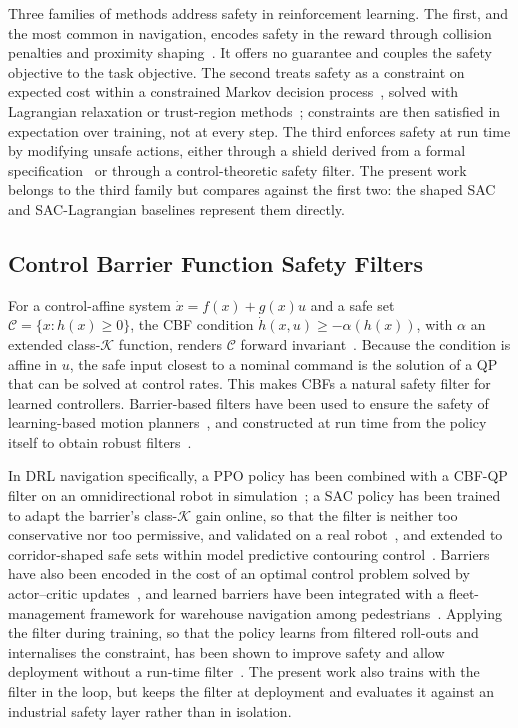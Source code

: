 \documentclass[sensors,article,submit,moreauthors]{Definitions/mdpi}
\begin{document}
Three families of methods address safety in reinforcement learning. The first, and the most common in navigation, encodes safety in the reward through collision penalties and proximity shaping~\citep{taheri2024ppo,cai2025agv,li2024warehouse}. It offers no guarantee and couples the safety objective to the task objective. The second treats safety as a constraint on expected cost within a constrained Markov decision process~\citep{altman1999cmdp}, solved with Lagrangian relaxation or trust-region methods~\citep{achiam2017cpo}; constraints are then satisfied in expectation over training, not at every step. The third enforces safety at run time by modifying unsafe actions, either through a shield derived from a formal specification~\citep{alshiekh2018shielding} or through a control-theoretic safety filter. The present work belongs to the third family but compares against the first two: the shaped SAC and SAC-Lagrangian baselines represent them directly.

\subsection{Control Barrier Function Safety Filters}

For a control-affine system $\dot{x} = f(x) + g(x)u$ and a safe set $\mathcal{C} = \{x : h(x) \geq 0\}$, the CBF condition $\dot{h}(x,u) \geq -\alpha(h(x))$, with $\alpha$ an extended class-$\mathcal{K}$ function, renders $\mathcal{C}$ forward invariant~\citep{ames2017cbfqp,ames2019cbf}. Because the condition is affine in $u$, the safe input closest to a nominal command is the solution of a QP that can be solved at control rates. This makes CBFs a natural safety filter for learned controllers. Barrier-based filters have been used to ensure the safety of learning-based motion planners~\citep{wang2022ensuring}, and constructed at run time from the policy itself to obtain robust filters~\citep{knoedler2025onthefly}.

In DRL navigation specifically, a PPO policy has been combined with a CBF-QP filter on an omnidirectional robot in simulation~\citep{guo2025radar}; a SAC policy has been trained to adapt the barrier's class-$\mathcal{K}$ gain online, so that the filter is neither too conservative nor too permissive, and validated on a real robot~\citep{mohammad2025sacadapt}, and extended to corridor-shaped safe sets within model predictive contouring control~\citep{mohammad2025corridor}. Barriers have also been encoded in the cost of an optimal control problem solved by actor--critic updates~\citep{wang2024safeadp}, and learned barriers have been integrated with a fleet-management framework for warehouse navigation among pedestrians~\citep{farrell2025warehouse}. Applying the filter during training, so that the policy learns from filtered roll-outs and internalises the constraint, has been shown to improve safety and allow deployment without a run-time filter~\citep{cheng2019endtoend,yang2025cbfrl}. The present work also trains with the filter in the loop, but keeps the filter at deployment and evaluates it against an industrial safety layer rather than in isolation.
\end{document}
